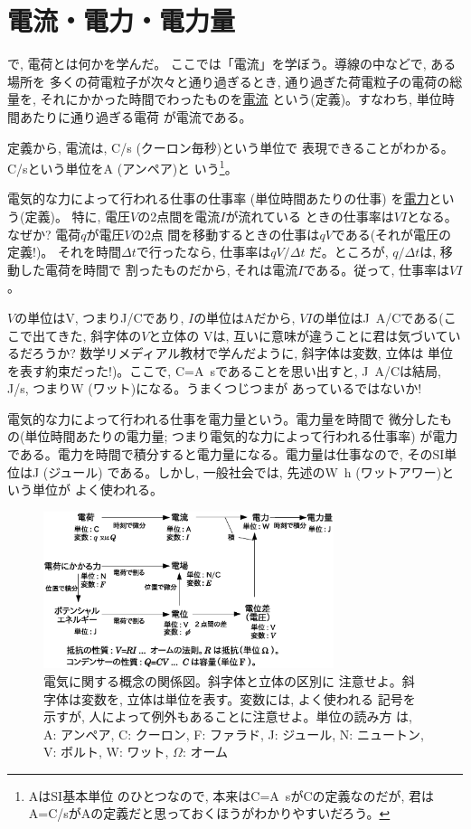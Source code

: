 \section{電流・電力・電力量}

で, 電荷とは何かを学んだ。
ここでは「電流」を学ぼう。導線の中などで, ある場所を
多くの荷電粒子が次々と通り過ぎるとき, 通り過ぎた荷電粒子の電荷の総量を, 
それにかかった時間でわったものを\underline{電流}
という(定義)。すなわち, 単位時間あたりに通り過ぎる電荷
が電流である。

定義から, 電流は, C/s (クーロン毎秒)という単位で
表現できることがわかる。C/sという単位をA (アンペア)と
いう\footnote{AはSI基本単位
のひとつなので, 本来はC=A~sがCの定義なのだが, 君は
A=C/sがAの定義だと思っておくほうがわかりやすいだろう。}。\mv

電気的な力によって行われる仕事の仕事率 (単位時間あたりの仕事)
を\underline{電力}という(定義)。
特に, 電圧$V$の2点間を電流$I$が流れている
ときの仕事率は$VI$となる。なぜか? 電荷$q$が電圧$V$の2点
間を移動するときの仕事は$qV$である(それが電圧の定義!)。
それを時間$\Delta t$で行ったなら, 仕事率は$qV/\Delta t$
だ。ところが, $q/\Delta t$は, 移動した電荷を時間で
割ったものだから, それは電流$I$である。従って, 仕事率は$VI$。

$V$の単位はV, つまりJ/Cであり, $I$の単位はAだから, 
$VI$の単位はJ~A/Cである(ここで出てきた, 斜字体の$V$と立体の
Vは, 互いに意味が違うことに君は気づいているだろうか? 
数学リメディアル教材で学んだように, 斜字体は変数, 立体は
単位を表す約束だった!)。ここで, C=A~sであることを思い出すと, 
J~A/Cは結局, J/s, つまりW (ワット)になる。うまくつじつまが
あっているではないか!

電気的な力によって行われる仕事を電力量という。電力量を時間で
微分したもの(単位時間あたりの電力量; つまり電気的な力によって行われる仕事率)
が電力である。電力を時間で積分すると電力量になる。電力量は仕事なので, そのSI単位はJ (ジュール)
である。しかし, 一般社会では, 先述のW~h (ワットアワー)という単位が
よく使われる。\mv

\begin{figure}[h]
    \centering
    \includegraphics[width=8.5cm]{electronics.eps}
    \caption{電気に関する概念の関係図。斜字体と立体の区別に
注意せよ。斜字体は変数を, 立体は単位を表す。変数には, よく使われる
記号を示すが, 人によって例外もあることに注意せよ。単位の読み方
は, A: アンペア, C: クーロン, F: ファラド, J: ジュール, 
N: ニュートン, V: ボルト, W: ワット, $\Omega$: オーム}\label{fig:electronics}
\end{figure}


